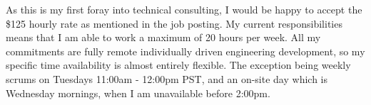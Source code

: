 \documentclass[11pt, a4paper]{awesome-cv-coverletter}
\begin{document}
\begin{cvletter}
As this is my first foray into technical consulting, I would be happy to accept
the \$125 hourly rate as mentioned in the job posting. My current
responsibilities means that I am able to work a maximum of 20 hours per week.
All my commitments are fully remote individually driven engineering development,
so my specific time availability is almost entirely flexible. The exception being
weekly scrums on Tuesdays 11:00am - 12:00pm PST, and an on-site day which is
Wednesday mornings, when I am unavailable before 2:00pm.

\end{cvletter}
\makeletterclosing
\end{document}
